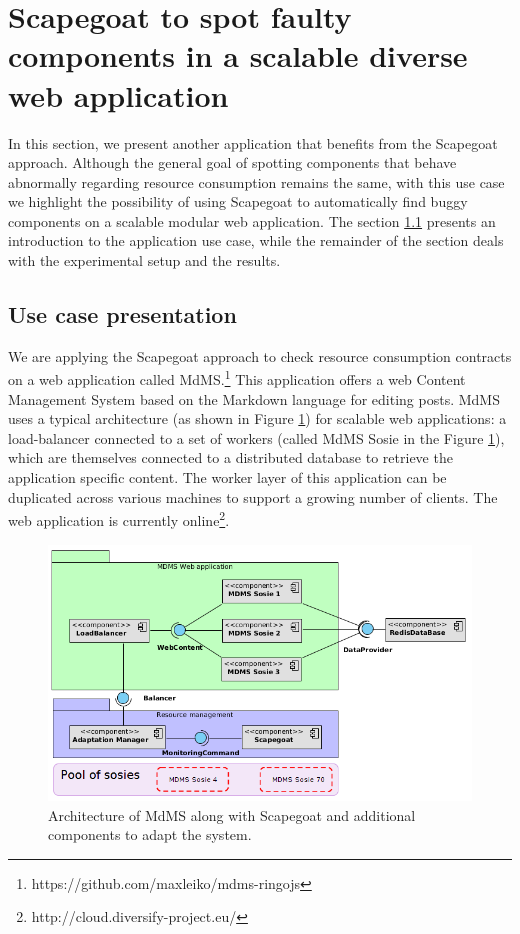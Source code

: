 \section{Scapegoat to spot faulty components in a scalable diverse web application}\label{sec:WebStudy}
In this section, we present another application that benefits from the Scapegoat approach.
Although the general goal of spotting components that behave abnormally regarding resource consumption remains the same, with this use case we highlight the possibility of using Scapegoat 
to automatically find buggy components on a scalable modular web application.
The section \ref{MdMS} presents an introduction to the application use case, while the remainder of the section deals with the experimental setup and the results.


\subsection{Use case presentation}\label{MdMS}
We are applying the Scapegoat approach to check resource consumption contracts on a web application called MdMS.\footnote{https://github.com/maxleiko/mdms-ringojs}
This application offers a web Content Management System based on the Markdown language for editing posts. 
MdMS uses a typical architecture (as shown in Figure \ref{fig:webapp}) for scalable web applications: a load-balancer connected to a set of workers (called MdMS Sosie in the Figure \ref{fig:webapp}), which are themselves connected to a distributed database to retrieve the application specific content.
The worker layer of this application can be duplicated across various machines to support a growing number of clients.
The web application is currently online\footnote{http://cloud.diversify-project.eu/}. 

\begin{figure}[!bt]
	\centering
	\includegraphics[scale=0.45]{./chapter5/figures/webapp2}
	\caption{\label{fig:webapp}Architecture of MdMS along with Scapegoat and additional components to adapt the system.}
\end{figure}


